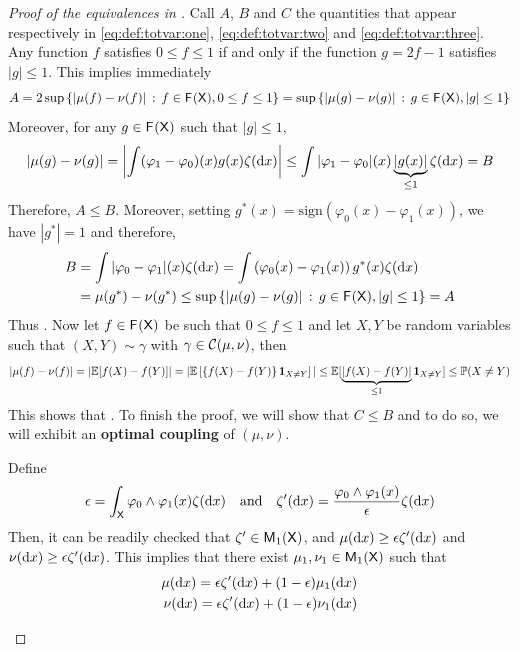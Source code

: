 \documentclass[english,graybox,envcountchap,envcountsame,sectrefs,shortlabels]{svmono}
\theoremstyle{style}
\newenvironment{svmultproof}{\small \begin{proof}}{\end{proof}}
\begin{document}
\begin{svmultproof}[Proof of the equivalences in ] Call $A$, $B$ and $C$ the quantities that appear respectively in \eqref{eq:def:totvar:one}, \eqref{eq:def:totvar:two} and \eqref{eq:def:totvar:three}.
Any function $f$ satisfies $0\leq f\leq 1$ if and only if  the function $g=2f-1$ satisfies $|g| \leq 1$. This implies immediately
$$
A=2\sup\left\{ |\mu(f)-\nu(f)|\,:\,f\in \mathsf{F_{}}(\mathsf{X}), 0\leq f\leq 1\right\}=\sup\left\{ |\mu(g)-\nu(g)|\,:\,g\in \mathsf{F_{}}(\mathsf{X}), |g|\leq 1\right\}
$$
Moreover, for any $g\in \mathsf{F_{}}(\mathsf{X})$ such that $|g|\leq 1$,
$$
|\mu(g)-\nu(g)|=\left|\int (\varphi_1-\varphi_0)(x)g(x) \zeta(\mathrm{d} x) \right|\leq \int |\varphi_1-\varphi_0|(x)\underbrace{|g(x)|}_{\leq 1} \zeta(\mathrm{d} x)=B
$$
Therefore, $A\leq B$. Moreover, setting $g^*(x)=\mathrm{sign}(\varphi_0(x)-\varphi_1(x))$, we have $|g^*|=1$ and therefore,
\begin{align*}
B&=\int |\varphi_0-\varphi_1|(x) \zeta(\mathrm{d} x)=\int  \left(\varphi_0(x)-\varphi_1(x)\right){g^*(x)} \zeta(\mathrm{d} x)\\
 &= \mu(g^*) -\nu(g^*)\leq \sup\left\{ |\mu(g)-\nu(g)|\,:\,g\in \mathsf{F_{}}(\mathsf{X}), |g|\leq 1\right\}=A
\end{align*}
Thus . Now let $f\in \mathsf{F_{}}(\mathsf{X})$ be such that $0\leq f\leq 1$ and let $X,Y$ be random variables such that $(X,Y)\sim \gamma$ with $\gamma\in \mathcal{C}(\mu,\nu)$, then
$$
|\mu(f)-\nu(f)|=|\mathbb{E}[f(X)-f(Y)]|=|\mathbb{E}\left[\left\{ f(X)-f(Y)\right\}\mathbf{1}_{X\neq Y}\right]|\leq \mathbb{E}[\underbrace{|f(X)-f(Y)|}_{\leq 1}\mathbf{1}_{X\neq Y}] \leq \mathbb{P}(X\neq Y)
$$
This shows that . To finish the proof, we will show that $C\leq B$ and to do so, we will exhibit an \textbf{optimal coupling} of $(\mu,\nu)$. 
\begin{leftbar}
Define
$$
\epsilon=\int_{\mathsf{X}} \varphi_0\wedge \varphi_1(x) \zeta(\mathrm{d} x) \quad \mbox{and} \quad  \zeta'(\mathrm{d} x)=\frac{\varphi_0\wedge \varphi_1(x) }{\epsilon}\zeta(\mathrm{d} x)
$$
Then, it can be readily checked that $\zeta'\in \mathsf{M}_{1}(\mathsf{X})$, and $\mu(\mathrm{d} x)\geq \epsilon \zeta'(\mathrm{d} x)$ and $\nu(\mathrm{d} x)\geq \epsilon \zeta'(\mathrm{d} x)$. This implies that there exist $\mu_1,\nu_1\in\mathsf{M}_{1}(\mathsf{X})$ such that
\begin{align*}
\mu(\mathrm{d} x)=\epsilon \zeta'(\mathrm{d} x) + (1-\epsilon) \mu_1(\mathrm{d} x)\\
\nu(\mathrm{d} x)=\epsilon \zeta'(\mathrm{d} x) + (1-\epsilon) \nu_1(\mathrm{d} x)
\end{align*}

\end{leftbar}


\end{svmultproof}
\end{document}
